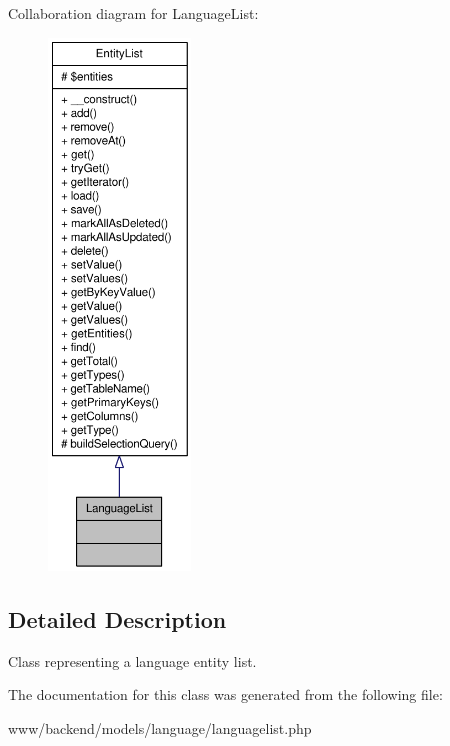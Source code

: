 Collaboration diagram for LanguageList:\nopagebreak
\begin{figure}[H]
\begin{center}
\leavevmode
\includegraphics[height=400pt]{classLanguageList__coll__graph}
\end{center}
\end{figure}


\subsection{Detailed Description}
Class representing a language entity list. 

The documentation for this class was generated from the following file:\begin{DoxyCompactItemize}
\item 
www/backend/models/language/languagelist.php\end{DoxyCompactItemize}
